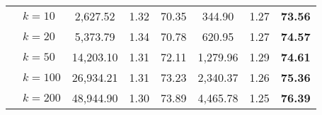 \begin{table}[htbp]
\begin{tabular}{|l|l|c|c|c|c|c|c|}
     & $k=10$ & 2,627.52 & 1.32 & 70.35 & 344.90 & 1.27 & \textbf{73.56} \\ 
     & $k=20$ & 5,373.79 & 1.34 & 70.78 & 620.95 & 1.27 & \textbf{74.57} \\ 
     & $k=50$ & 14,203.10 & 1.31 & 72.11 & 1,279.96 & 1.29 & \textbf{74.61} \\ 
     & $k=100$ & 26,934.21 & 1.31 & 73.23 & 2,340.37 & 1.26 & \textbf{75.36} \\ 
     & $k=200$ & 48,944.90 & 1.30 & 73.89 & 4,465.78 & 1.25 & \textbf{76.39} \\ \hline
    \end{tabular}
    \label{results:usecase_summary}
    \end{table}
    